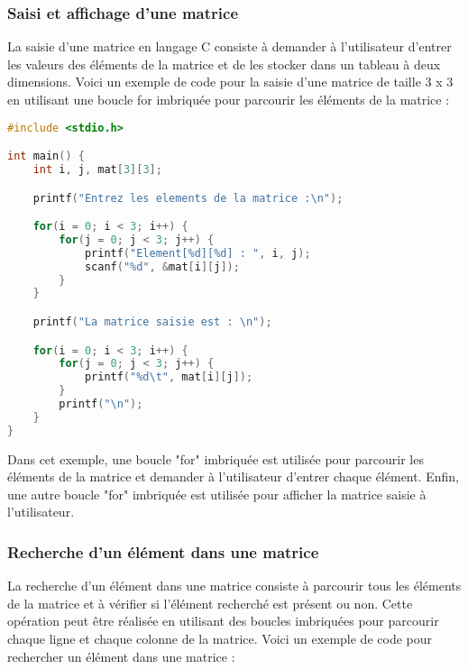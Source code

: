 \documentclass{uofa-eng-assignment}
\begin{document}
\subsubsection{Saisi et affichage d'une matrice}
La saisie d'une matrice en langage C consiste à demander à l'utilisateur d'entrer les valeurs des éléments de la matrice et de les stocker dans un tableau à deux dimensions.
\newline \newline
Voici un exemple de code pour la saisie d'une matrice de taille 3 x 3 en utilisant une boucle for imbriquée pour parcourir les éléments de la matrice :

\begin{lstlisting}[language=c]
#include <stdio.h>

int main() {
    int i, j, mat[3][3];

    printf("Entrez les elements de la matrice :\n");

    for(i = 0; i < 3; i++) {
        for(j = 0; j < 3; j++) {
            printf("Element[%d][%d] : ", i, j);
            scanf("%d", &mat[i][j]);
        }
    }

    printf("La matrice saisie est : \n");

    for(i = 0; i < 3; i++) {
        for(j = 0; j < 3; j++) {
            printf("%d\t", mat[i][j]);
        }
        printf("\n");
    }
}
\end{lstlisting}

\noindent \newline
Dans cet exemple, une boucle "for" imbriquée est utilisée pour parcourir les éléments de la matrice et demander à l'utilisateur d'entrer chaque élément. Enfin, une autre boucle "for" imbriquée est utilisée pour afficher la matrice saisie à l'utilisateur.

\subsubsection{Recherche d'un élément dans une matrice}
La recherche d'un élément dans une matrice consiste à parcourir tous les éléments de la matrice et à vérifier si l'élément recherché est présent ou non. Cette opération peut être réalisée en utilisant des boucles imbriquées pour parcourir chaque ligne et chaque colonne de la matrice.
\newline \newline
Voici un exemple de code pour rechercher un élément dans une matrice :
\end{document}
